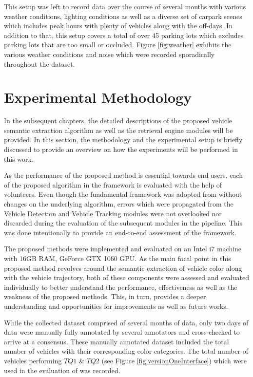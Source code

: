 This setup was left to record data over the course of several months with various weather conditions, lighting conditions as well as a diverse set of carpark scenes which includes peak hours with plenty of vehicles along with the off-days. In addition to that, this setup covers a total of over 45 parking lots which excludes parking lots that are too small or occluded. Figure \ref{fig:weather} exhibits the various weather conditions and noise which were recorded sporadically throughout the dataset.





\section{Experimental Methodology}
\label{sec:expmethodology}

In the subsequent chapters, the detailed descriptions of the proposed vehicle semantic extraction algorithm as well as the retrieval engine modules will be provided. In this section, the methodology and the experimental setup is briefly discussed to provide an overview on how the experiments will be performed in this work.

As the performance of the proposed method is essential towards end users, each of the proposed algorithm in the framework is evaluated with the help of volunteers. Even though the fundamental framework was adopted from \cite{lim2017} without changes on the underlying algorithm, errors which were propagated from the Vehicle Detection and Vehicle Tracking modules were not overlooked nor discarded during the evaluation of the subsequent modules in the pipeline. This was done intentionally to provide an end-to-end assessment of the framework. 

The proposed methods were implemented and evaluated on an Intel i7 machine with 16GB RAM, GeForce GTX 1060 GPU. As the main focal point in this proposed method revolves around the semantic extraction of vehicle color along with the vehicle trajectory, both of these components were assessed and evaluated individually to better understand the performance, effectiveness as well as the weakness of the proposed methods. This, in turn, provides a deeper understanding and opportunities for improvements as well as future works. 

While the collected dataset comprised of several months of data, only two days of data were manually fully annotated by several annotators and cross-checked to arrive at a consensus. These manually annotated dataset included the total number of vehicles with their corresponding color categories. The total number of vehicles performing $TQ1$ \& $TQ2$ (see Figure \ref{fig:versionOneInterface}) which were used in the evaluation of \versionOneRet was recorded. 

